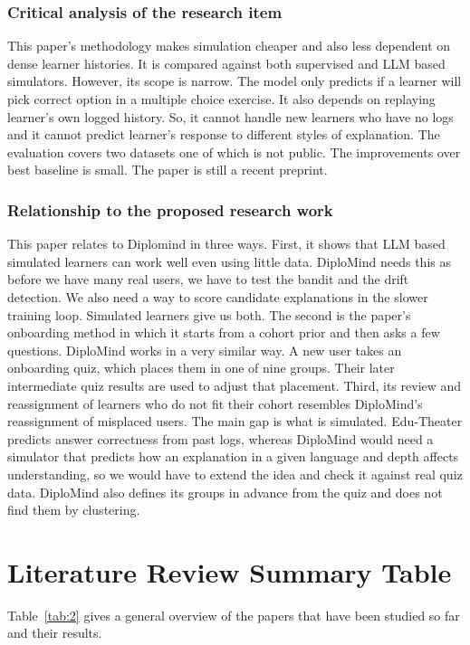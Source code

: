 \documentclass{FastFyp}
\begin{document}
\subsubsection{Critical analysis of the research item}
This paper's methodology makes simulation cheaper and also less dependent on dense learner histories. It is compared against both supervised and LLM based simulators. However, its scope is narrow. The model only predicts if a learner will pick correct option in a multiple choice exercise. It also depends on replaying learner's own logged history. So, it cannot handle new learners who have no logs and it cannot predict learner's response to different styles of explanation. The evaluation covers two datasets one of which is not public. The improvements over best baseline is small. The paper is still a recent preprint.


\subsubsection{Relationship to the proposed research work}
This paper relates to Diplomind in three ways. First, it shows that LLM based simulated learners can work well even using little data. DiploMind needs this as before we have many real users, we have to test the bandit and the drift detection. We also need a way to score candidate explanations in the slower training loop. Simulated learners give us both. The second is the paper’s onboarding method in which it starts from a cohort prior and then asks a few questions. DiploMind works in a very similar way. A new user takes an onboarding quiz, which places them in one of nine groups. Their later intermediate quiz results are used to adjust that placement. Third, its review and reassignment of learners who do not fit their cohort resembles DiploMind's reassignment of misplaced users. The main gap is what is simulated. Edu-Theater predicts answer correctness from past logs, whereas DiploMind would need a simulator that predicts how an explanation in a given language and depth affects understanding, so we would have to extend the idea and check it against real quiz data. DiploMind also defines its groups in advance from the quiz and does not find them by clustering.



\section{Literature Review Summary Table}
Table~\ref{tab:2} gives a general overview of the papers that have been studied so far and their results.
\end{document}
